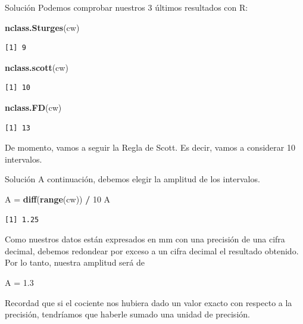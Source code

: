 \documentclass[
  ignorenonframetext,
  aspectratio=169]{beamer}
\newenvironment{Shaded}{\begin{snugshade}}{\end{snugshade}}
\newcommand{\DecValTok}[1]{\textcolor[rgb]{0.00,0.00,0.81}{#1}}
\newcommand{\FloatTok}[1]{\textcolor[rgb]{0.00,0.00,0.81}{#1}}
\newcommand{\FunctionTok}[1]{\textcolor[rgb]{0.13,0.29,0.53}{\textbf{#1}}}
\newcommand{\NormalTok}[1]{#1}
\newcommand{\OtherTok}[1]{\textcolor[rgb]{0.56,0.35,0.01}{#1}}
\newcommand{\SpecialCharTok}[1]{\textcolor[rgb]{0.81,0.36,0.00}{\textbf{#1}}}
\begin{document}
\begin{frame}[fragile]{Solución}
\label{soluciuxf3n-3}
Podemos comprobar nuestros 3 últimos resultados con R:

\begin{Shaded}
\begin{Highlighting}[]
\FunctionTok{nclass.Sturges}\NormalTok{(cw)}
\end{Highlighting}
\end{Shaded}

\begin{verbatim}
[1] 9
\end{verbatim}

\begin{Shaded}
\begin{Highlighting}[]
\FunctionTok{nclass.scott}\NormalTok{(cw)}
\end{Highlighting}
\end{Shaded}

\begin{verbatim}
[1] 10
\end{verbatim}

\begin{Shaded}
\begin{Highlighting}[]
\FunctionTok{nclass.FD}\NormalTok{(cw)}
\end{Highlighting}
\end{Shaded}

\begin{verbatim}
[1] 13
\end{verbatim}

De momento, vamos a seguir la Regla de Scott. Es decir, vamos a
considerar 10 intervalos.
\end{frame}

\begin{frame}[fragile]{Solución}
\label{soluciuxf3n-4}
A continuación, debemos elegir la amplitud de los intervalos.

\begin{Shaded}
\begin{Highlighting}[]
\NormalTok{A }\OtherTok{=} \FunctionTok{diff}\NormalTok{(}\FunctionTok{range}\NormalTok{(cw)) }\SpecialCharTok{/} \DecValTok{10}
\NormalTok{A}
\end{Highlighting}
\end{Shaded}

\begin{verbatim}
[1] 1.25
\end{verbatim}

Como nuestros datos están expresados en mm con una precisión de una
cifra decimal, debemos redondear por exceso a un cifra decimal el
resultado obtenido. Por lo tanto, nuestra amplitud será de

\begin{Shaded}
\begin{Highlighting}[]
\NormalTok{A }\OtherTok{=} \FloatTok{1.3}
\end{Highlighting}
\end{Shaded}

Recordad que si el cociente nos hubiera dado un valor exacto con
respecto a la precisión, tendríamos que haberle sumado una unidad de
precisión.
\end{frame}
\end{document}
